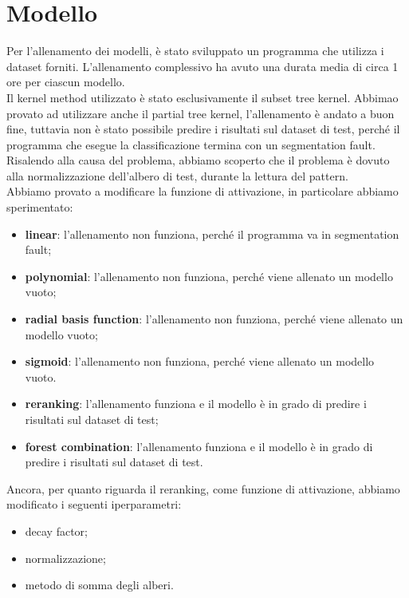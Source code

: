 \section{Modello}

Per l'allenamento dei modelli, è stato sviluppato un programma che utilizza i 
dataset forniti. L'allenamento complessivo ha avuto una durata media di circa 
1 ore per ciascun modello.\\
Il kernel method utilizzato è stato esclusivamente il subset tree 
kernel. Abbimao provato ad utilizzare anche il partial tree kernel,
l'allenamento è andato a buon fine, tuttavia non è stato possibile predire i
risultati sul dataset di test, perché il programma che esegue la classificazione
termina con un segmentation fault. Risalendo alla causa del problema, abbiamo
scoperto che il problema è dovuto alla normalizzazione dell'albero di test,
durante la lettura del pattern.\\

Abbiamo provato a modificare la funzione di attivazione, in particolare abbiamo
sperimentato:
\begin{itemize}
    \item \textbf{linear}: l'allenamento non funziona, perché il programma va in
        segmentation fault;

    \item \textbf{polynomial}: l'allenamento non funziona, perché viene allenato
        un modello vuoto;

    \item \textbf{radial basis function}: l'allenamento non funziona, perché
        viene allenato un modello vuoto;

    \item \textbf{sigmoid}: l'allenamento non funziona, perché viene allenato un
        modello vuoto.

    \item \textbf{reranking}: l'allenamento funziona e il modello è in grado di
        predire i risultati sul dataset di test;

    \item \textbf{forest combination}: l'allenamento funziona e il modello è in
        grado di predire i risultati sul dataset di test.
\end{itemize}

Ancora, per quanto riguarda il reranking, come funzione di attivazione, abbiamo
modificato i seguenti iperparametri:
\begin{itemize}
    \item decay factor;
    \item normalizzazione;
    \item metodo di somma degli alberi.
\end{itemize}

